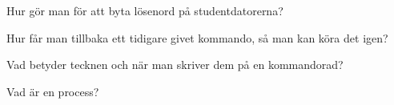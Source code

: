 \item Hur gör man för att byta lösenord på studentdatorerna?
\qskip
\item Hur får man tillbaka ett tidigare givet kommando, så man kan köra det igen?
\qskip
\item Vad betyder tecknen \code{<} och \code{>} när man skriver dem på en kommandorad?
\qskip
\item Vad är en process?
\qskip
